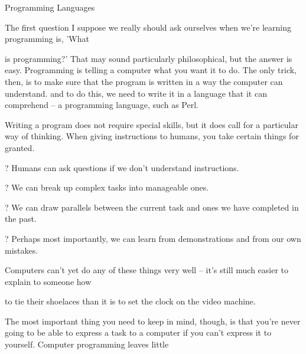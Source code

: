 \documentclass[a4paper,11pt]{book}
\begin{document}
\noindent 

\noindent 

\noindent Programming Languages

\noindent 

\noindent The first question I suppose we really should ask ourselves when we're learning programming is, 'What

\noindent is programming?' That may sound particularly philosophical, but the answer is easy. Programming is telling a computer what you want it to do. The only trick, then, is to make sure that the program is written in a way the computer can understand. and to do this, we need to write it in a language that it can comprehend -- a programming language, such as Perl.

\noindent 

\noindent Writing a program does not require special skills, but it does call for a particular way of thinking. When giving instructions to humans, you take certain things for granted.

\noindent 

\noindent ? Humans can ask questions if we don't understand instructions.

\noindent 

\noindent ? We can break up complex tasks into manageable ones.

\noindent 

\noindent ? We can draw parallels between the current task and ones we have completed in the past.

\noindent 

\noindent ? Perhaps most importantly, we can learn from demonstrations and from our own mistakes.

\noindent  

\noindent  

\noindent  

\noindent  

\noindent 

\noindent 

\noindent Computers can't yet do any of these things very well -- it's still much easier to explain to someone how

\noindent to tie their shoelaces than it is to set the clock on the video machine.

\noindent 

\noindent The most important thing you need to keep in mind, though, is that you're never going to be able to express a task to a computer if you can't express it to yourself. Computer programming leaves little
\end{document}
